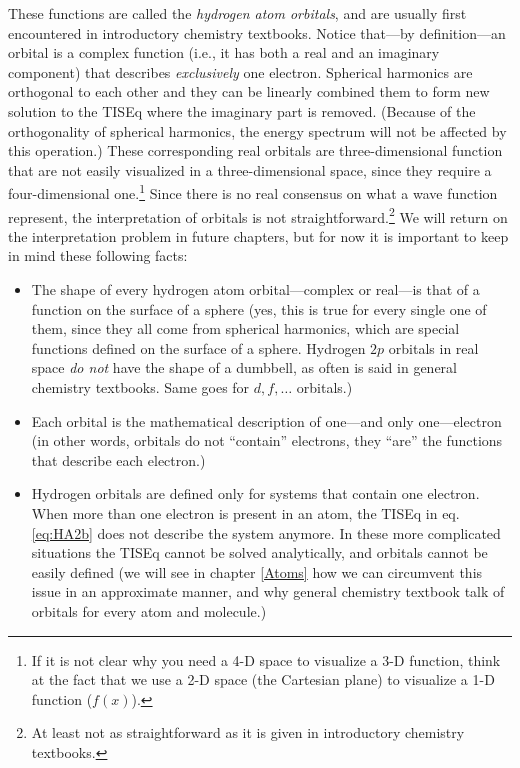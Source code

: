 \documentclass[
  9pt,
]{extbook}
\providecommand{\tightlist}{%
  \setlength{\itemsep}{0pt}\setlength{\parskip}{0pt}}
\theoremstyle{definition}
\theoremstyle{definition}
\theoremstyle{definition}
\theoremstyle{remark}
\begin{document}
These functions are called the \emph{hydrogen atom orbitals}, and are usually first encountered in introductory chemistry textbooks. Notice that---by definition---an orbital is a complex function (i.e., it has both a real and an imaginary component) that describes \emph{exclusively} one electron. Spherical harmonics are orthogonal to each other and they can be linearly combined them to form new solution to the TISEq where the imaginary part is removed. (Because of the orthogonality of spherical harmonics, the energy spectrum will not be affected by this operation.) These corresponding real orbitals are three-dimensional function that are not easily visualized in a three-dimensional space, since they require a four-dimensional one.\footnote{If it is not clear why you need a 4-D space to visualize a 3-D function, think at the fact that we use a 2-D space (the Cartesian plane) to visualize a 1-D function (\(f(x)\)).} Since there is no real consensus on what a wave function represent, the interpretation of orbitals is not straightforward.\footnote{At least not as straightforward as it is given in introductory chemistry textbooks.} We will return on the interpretation problem in future chapters, but for now it is important to keep in mind these following facts:

\begin{itemize}
\tightlist
\item
  The shape of every hydrogen atom orbital---complex or real---is that of a function on the surface of a sphere (yes, this is true for every single one of them, since they all come from spherical harmonics, which are special functions defined on the surface of a sphere. Hydrogen \(2p\) orbitals in real space \emph{do not} have the shape of a dumbbell, as often is said in general chemistry textbooks. Same goes for \(d, f, \ldots\) orbitals.)
\item
  Each orbital is the mathematical description of one---and only one---electron (in other words, orbitals do not ``contain'' electrons, they ``are'' the functions that describe each electron.)
\item
  Hydrogen orbitals are defined only for systems that contain one electron. When more than one electron is present in an atom, the TISEq in eq. \eqref{eq:HA2b} does not describe the system anymore. In these more complicated situations the TISEq cannot be solved analytically, and orbitals cannot be easily defined (we will see in chapter \ref{Atoms} how we can circumvent this issue in an approximate manner, and why general chemistry textbook talk of orbitals for every atom and molecule.)
\end{itemize}
\end{document}
